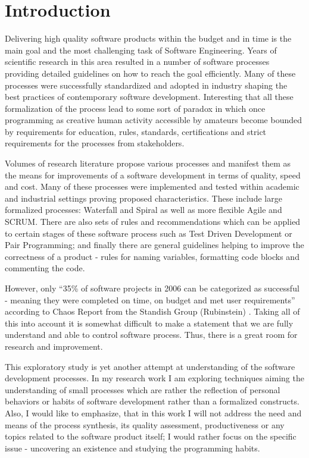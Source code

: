 \chapter{Introduction}
Delivering high quality software products within the budget and in time is the main goal and the most 
challenging task of Software Engineering. Years of scientific research in
this area resulted in a number of software processes providing detailed guidelines on how to reach 
the goal efficiently. Many of these processes were successfully standardized and adopted 
in industry shaping the best practices of contemporary software development. 
Interesting that all these formalization of the process lead to some sort of paradox in which 
once programming as creative human activity accessible by amateurs become bounded by requirements 
for education, rules, standards, certifications and strict requirements for the processes 
from stakeholders. 

Volumes of research literature propose various processes and manifest them as the 
means for improvements of a software development in terms of quality, speed and cost. 
Many of these processes were implemented and tested within academic and industrial 
settings proving proposed characteristics. These include large formalized processes: 
Waterfall and Spiral as well as more flexible Agile and SCRUM. 
There are also sets of rules and recommendations which can be applied to certain 
stages of these software process such as Test Driven Development or Pair Programming; 
and finally there are general guidelines helping to improve the correctness of a 
product - rules for naming variables, formatting code blocks and commenting the code. 

However, only ``35\% of software projects in 2006 can be categorized as successful - meaning 
they were completed on time, on budget and met user requirements'' according to Chaos Report
from the Standish Group (Rubinstein) \cite{SDTimes}. Taking all of this into account it is 
somewhat difficult to make a statement that we are fully understand and able to control 
software process. Thus, there is a great room for research and improvement.

This exploratory study is yet another attempt at understanding of the software development processes. 
In my research work I am exploring techniques aiming the understanding of small processes which are 
rather the reflection of personal behaviors or habits of software development rather than a 
formalized constructs. Also, I would like to emphasize, that in this work I will not 
address the need and means of the process synthesis, its quality assessment, productiveness
or any topics related to the software product itself; I would rather focus on the specific issue - 
uncovering an existence and studying the programming habits. 

